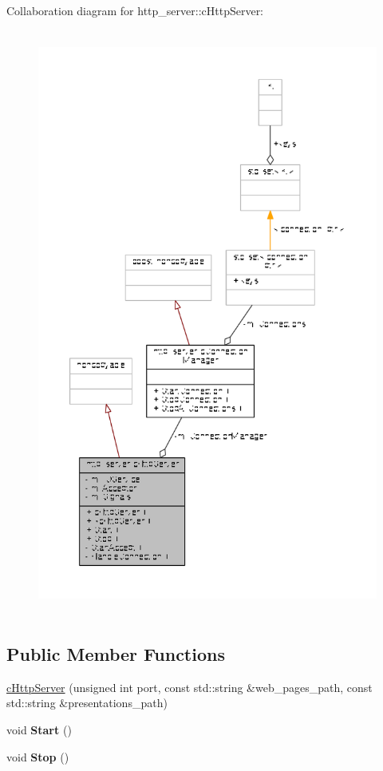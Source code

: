 Collaboration diagram for http\-\_\-server\-:\-:c\-Http\-Server\-:
\nopagebreak
\begin{figure}[H]
\begin{center}
\leavevmode
\includegraphics[height=550pt]{classhttp__server_1_1cHttpServer__coll__graph}
\end{center}
\end{figure}
\subsection*{Public Member Functions}
\begin{DoxyCompactItemize}
\item 
\hyperlink{classhttp__server_1_1cHttpServer_ab860b9308bed0345da118105585098ba}{c\-Http\-Server} (unsigned int port, const std\-::string \&web\-\_\-pages\-\_\-path, const std\-::string \&presentations\-\_\-path)
\item 
\hypertarget{classhttp__server_1_1cHttpServer_ad4699b20627615aee961a06eae97fb89}{void {\bfseries Start} ()}\label{classhttp__server_1_1cHttpServer_ad4699b20627615aee961a06eae97fb89}

\item 
\hypertarget{classhttp__server_1_1cHttpServer_a2c7bcb8fb8ca1aa5fe26d00c94c11835}{void {\bfseries Stop} ()}\label{classhttp__server_1_1cHttpServer_a2c7bcb8fb8ca1aa5fe26d00c94c11835}

\end{DoxyCompactItemize}
